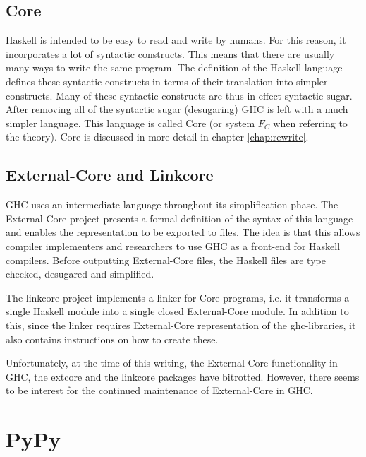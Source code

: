 \subsection*{Core}

Haskell is intended to be easy to read and write by humans. For this reason, it
incorporates a lot of syntactic constructs. This means that there are
usually many ways to write the same program. The definition of the Haskell language
defines these syntactic constructs in terms of their translation into simpler
constructs. Many of these syntactic constructs are thus in effect syntactic sugar.
After removing all of the syntactic sugar (desugaring) GHC is left with a much 
simpler language. This language is called Core (or system $F_C$ when referring to
the theory).\cite{marlow2012glasgow} Core is discussed in more detail in chapter 
\ref{chap:rewrite}.

\subsection*{External-Core and Linkcore}

GHC uses an intermediate language throughout its 
simplification phase. The External-Core project presents a formal definition of the syntax 
of this language and enables the representation to be exported 
to files. The idea is that this allows compiler implementers and researchers to use GHC
as a front-end for Haskell compilers. Before outputting External-Core files,
the Haskell files are type checked, desugared and simplified. \cite{tolmach2010ghc}

The linkcore project implements a linker for Core programs, i.e. it transforms
a single Haskell module into a single closed External-Core module. In addition to
this, since the linker requires External-Core representation of the ghc-libraries,
it also contains instructions on how to create these. 

Unfortunately, at the time of this writing, the External-Core functionality in
GHC, the extcore and the linkcore 
packages have bitrotted. However, there seems to be interest for the continued 
maintenance of External-Core in GHC.


\section{PyPy}

